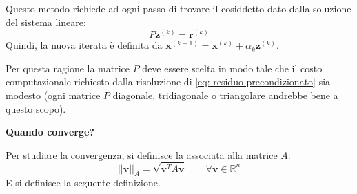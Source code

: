 \highspace
Questo metodo richiede ad ogni passo di trovare il cosiddetto  dato dalla soluzione del sistema lineare:
\begin{equation}\label{eq: residuo precondizionato}
    P\mathbf{z}^{\left(k\right)} = \mathbf{r}^{\left(k\right)}
\end{equation}
Quindi, la nuova iterata è definita da $\mathbf{x}^{\left(k+1\right)} = \mathbf{x}^{\left(k\right)} + \alpha_{k}\mathbf{z}^{\left(k\right)}$.

Per questa ragione la matrice $P$ deve essere scelta in modo tale che il costo computazionale richiesto dalla risoluzione di \ref{eq: residuo precondizionato} sia modesto (ogni matrice $P$ diagonale, tridiagonale o triangolare andrebbe bene a questo scopo).

\newpage

\begin{flushleft}
    \textcolor{Green3}{ \textbf{Quando converge?}}
\end{flushleft}
Per studiare la convergenza, si definisce la  associata alla matrice $A$:
\begin{equation}\label{eq: norma dell'energia}
    \left|\left| \mathbf{v} \right|\right|_{A} = \sqrt{\mathbf{v}^{T} A \mathbf{v}} \hspace{2em} \forall\mathbf{v} \in \mathbb{R}^{n}
\end{equation}
E si definisce la seguente definizione.

